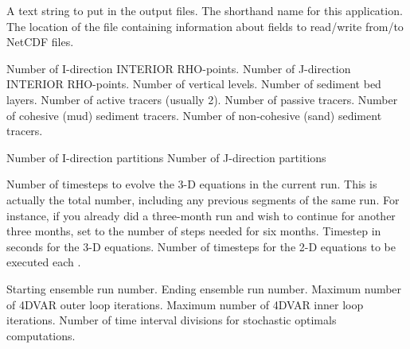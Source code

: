 \begin{klist}
    \mbox{}
     \begin{klist}
    A text string to put in the output files.
    The shorthand name for this application.
    The location of the  file
     containing information about fields to read/write from/to NetCDF
     files.
     \end{klist}
    \mbox{}
     \begin{klist}
        Number of I-direction INTERIOR RHO-points.
        Number of J-direction INTERIOR RHO-points.
        Number of vertical levels.
        Number of sediment bed layers.
        Number of active tracers (usually 2).
        Number of passive tracers.
        Number of cohesive (mud) sediment tracers.
        Number of non-cohesive (sand) sediment tracers.
     \end{klist}
    \mbox{}
     \begin{klist}
        Number of I-direction partitions
        Number of J-direction partitions
     \end{klist}
    \mbox{}
     \begin{klist}
           Number of timesteps to evolve the 3-D
       equations in the current run.  This is actually the total
     number, including any previous segments of the same run.  For
     instance, if you already did a three-month run and wish to
     continue for another three months, set  to the
     number of steps needed for six months.
               Timestep in seconds for the 3-D equations.
          Number of timesteps for the 2-D equations
     to be executed each .
     \end{klist}
    \mbox{}
     \begin{klist}
        Starting ensemble run number.
        Ending ensemble run number.
        Maximum number of 4DVAR outer loop iterations.
        Maximum number of 4DVAR inner loop iterations.
        Number of time interval divisions for
       stochastic optimals computations.
     \end{klist}
    \mbox{}

\end{klist}
